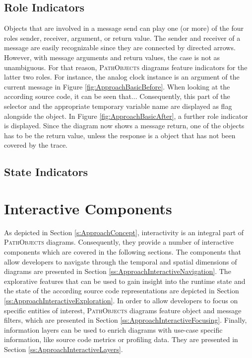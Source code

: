 \subsection{Role Indicators}
\label{ss:ApproachNotationRoles}
Objects that are involved in a message send can play one (or more) of the four roles sender, receiver, argument, or return value.
The sender and receiver of a message are easily recognizable since they are connected by directed arrows.
However, with message arguments and return values, the case is not as unambiguous.
For that reason, \textsc{PathObjects} diagrams feature indicators for the latter two roles.
For instance, the analog clock instance is an argument of the current message in Figure \ref{fig:ApproachBasicBefore}.
When looking at the according source code, it can be seen that...
Consequently, this part of the selector and the appropriate temporary variable name are displayed as flag alongside the object.
In Figure \ref{fig:ApproachBasicAfter}, a further role indicator is displayed.
Since the diagram now shows a message return, one of the objects has to be the return value, unless the response is a object that has not been covered by the trace.



\subsection{State Indicators}
\label{ss:ApproachNotationState}


\section{Interactive Components}
\label{s:ApproachInteractivity}
As depicted in Section \ref{s:ApproachConcept}, interactivity is an integral part of \textsc{PathObjects} diagrams.
Consequently, they provide a number of interactive components which are covered in the following sections.
The components that allow developers to navigate through the temporal and spatial dimensions of diagrams are presented in Section \ref{ss:ApproachInteractiveNavigation}.
The explorative features that can be used to gain insight into the runtime state and the state of the according source code representations are depicted in Section \ref{ss:ApproachInteractiveExploration}.
In order to allow developers to focus on specific entities of interest, \textsc{PathObjects} diagrams feature object and message filters, which are presented in Section \ref{ss:ApproachInteractiveFocusing}.
Finally, information layers can be used to enrich diagrams with use-case specific information, like source code metrics or profiling data.
They are presented in Section \ref{ss:ApproachInteractiveLayers}.

